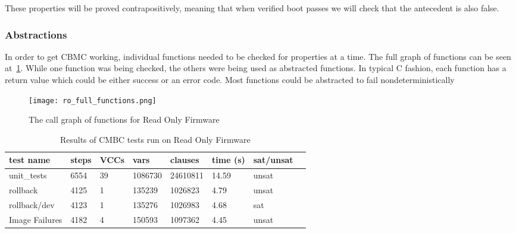 \documentclass[../report.tex]{subfiles}
\begin{document}
These properties will be proved contrapositively, meaning that when verified boot passes we will check that the antecedent is also false.

\subsubsection{Abstractions}

In order to get CBMC working, individual functions needed to be checked for properties at a time.
The full graph of functions can be seen at~\ref{fig:full_functions}.
While one function was being checked, the others were being used as abstracted functions.
In typical C fashion, each function has a return value which could be either success or an error code. 
Most functions could be abstracted to fail nondeterministically 

\begin{figure}
  \centering
  \texttt{[image: ro\_full\_functions.png]}
  \caption{The call graph of functions for Read Only Firmware}\label{fig:full_functions}
\end{figure}

\begin{table}[]
    \centering
    \caption{Results of CMBC tests run on Read Only Firmware}\label{cbmc_results}
    \begin{tabular}{|l|l|l|l|l|l|l|l|}
        \hline
        test name & steps & VCCs & vars  & clauses & time (s) & sat/unsat  \\ \hline \hline
        unit\_tests & 6554 & 39 & 1086730 & 24610811 & 14.59 & unsat \\ \hline
        rollback  & 4125 & 1 & 135239 & 1026823 & 4.79 & unsat \\ \hline
        rollback/dev & 4123 & 1 & 135276 & 1026983 & 4.68 & sat \\ \hline
        Image Failures & 4182 & 4 & 150593 & 1097362 & 4.45 & unsat \\ \hline
    \end{tabular}
\end{table}

\clearpage
\end{document}
